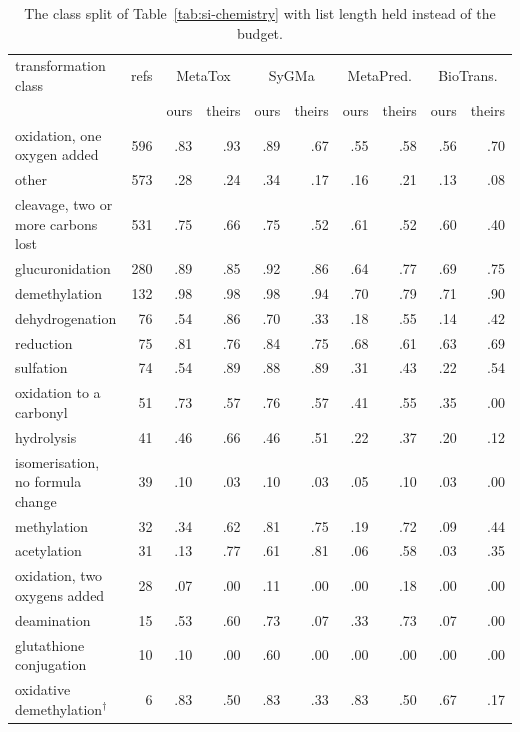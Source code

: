 \begin{table}[h]
\centering\scriptsize
\begin{threeparttable}
\caption{The class split of Table~\ref{tab:si-chemistry} with list length held instead of the budget.}
\label{tab:si-chemistry-matched}
\begin{tabular}{@{}lrrrrrrrrr@{}}
\toprule
transformation class & refs & \multicolumn{2}{c}{MetaTox} & \multicolumn{2}{c}{SyGMa} & \multicolumn{2}{c}{MetaPred.} & \multicolumn{2}{c}{BioTrans.} \\
 & & ours & theirs & ours & theirs & ours & theirs & ours & theirs \\
\midrule
oxidation, one oxygen added & 596 & .83 & .93 & .89 & .67 & .55 & .58 & .56 & .70 \\
other & 573 & .28 & .24 & .34 & .17 & .16 & .21 & .13 & .08 \\
cleavage, two or more carbons lost & 531 & .75 & .66 & .75 & .52 & .61 & .52 & .60 & .40 \\
glucuronidation & 280 & .89 & .85 & .92 & .86 & .64 & .77 & .69 & .75 \\
demethylation & 132 & .98 & .98 & .98 & .94 & .70 & .79 & .71 & .90 \\
dehydrogenation & 76 & .54 & .86 & .70 & .33 & .18 & .55 & .14 & .42 \\
reduction & 75 & .81 & .76 & .84 & .75 & .68 & .61 & .63 & .69 \\
sulfation & 74 & .54 & .89 & .88 & .89 & .31 & .43 & .22 & .54 \\
oxidation to a carbonyl & 51 & .73 & .57 & .76 & .57 & .41 & .55 & .35 & .00 \\
hydrolysis & 41 & .46 & .66 & .46 & .51 & .22 & .37 & .20 & .12 \\
isomerisation, no formula change & 39 & .10 & .03 & .10 & .03 & .05 & .10 & .03 & .00 \\
methylation & 32 & .34 & .62 & .81 & .75 & .19 & .72 & .09 & .44 \\
acetylation & 31 & .13 & .77 & .61 & .81 & .06 & .58 & .03 & .35 \\
oxidation, two oxygens added & 28 & .07 & .00 & .11 & .00 & .00 & .18 & .00 & .00 \\
deamination & 15 & .53 & .60 & .73 & .07 & .33 & .73 & .07 & .00 \\
glutathione conjugation & 10 & .10 & .00 & .60 & .00 & .00 & .00 & .00 & .00 \\
oxidative demethylation$^{\dagger}$ & 6 & .83 & .50 & .83 & .33 & .83 & .50 & .67 & .17 \\

\end{tabular}
\end{threeparttable}
\end{table}
